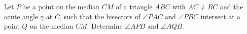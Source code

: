 Let $P$ be a point on the median $CM$ of a triangle $ABC$ with $AC\ne BC$ and the acute angle $\gamma$ at $C$, such that the bisectors of $\angle PAC$ and $\angle PBC$ intersect at a point $Q$ on the median $CM$. Determine $\angle APB$ and $\angle AQB$.